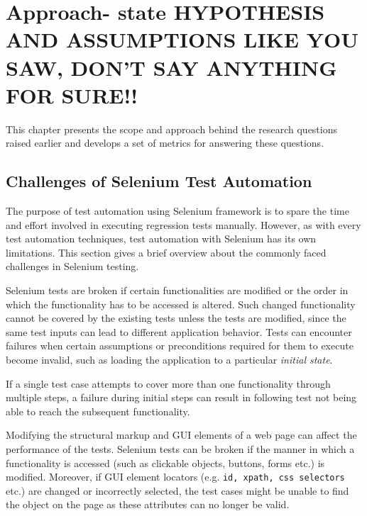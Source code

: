 \chapter{Approach- state HYPOTHESIS AND ASSUMPTIONS LIKE YOU SAW, DON'T SAY ANYTHING FOR SURE!!  } %
\label{Chapter3} %


This chapter presents the scope and approach behind the research questions raised earlier and develops a set of metrics for answering these questions.

\section{Challenges of Selenium Test Automation}
\label{challengesSelenium}
The purpose of test automation using Selenium framework is to spare the time and effort involved in executing regression tests manually. However, as with every test automation techniques, test automation with Selenium has its own limitations. This section gives a brief overview about the commonly faced challenges in Selenium testing.

Selenium tests are broken if certain functionalities are modified or the order in which the functionality has to be accessed is altered.
Such changed functionality cannot be covered by the existing tests unless the tests are modified, since the same test inputs can lead to different application behavior. Tests can encounter failures when certain assumptions or preconditions required for them to execute become invalid, such as loading the application to a particular \textit{initial state}.

If a single test case attempts to cover more than one functionality through multiple steps, a failure during initial steps can result in following test not being able to reach the subsequent functionality.

Modifying the structural markup and GUI elements of a web page can affect the performance of the tests. Selenium tests can be broken if the manner in which a functionality is accessed (such as clickable objects, buttons, forms etc.) is modified. Moreover, if GUI element locators (e.g. \texttt{id, xpath, css selectors} etc.) are changed or incorrectly selected, the test cases might be unable to find the object on the page as these attributes can no longer be valid.

